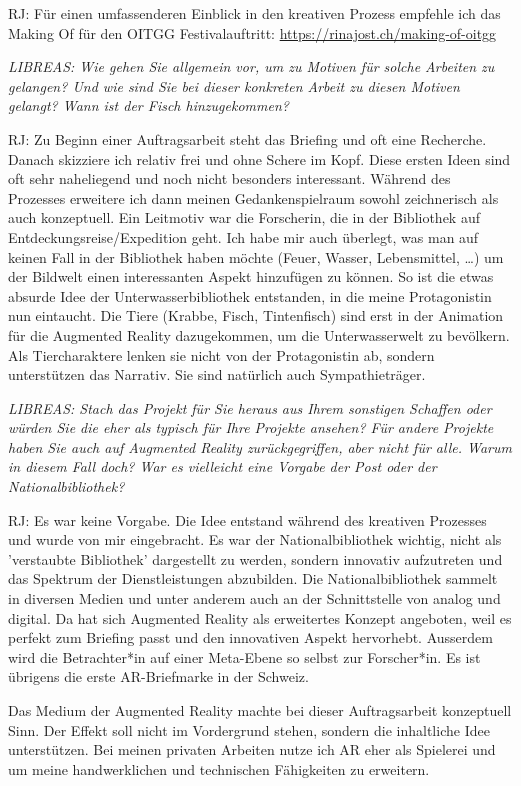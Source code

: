\documentclass[a4paper,
fontsize=11pt,
oneside,
numbers=noperiodatend,
parskip=half-,
bibliography=totoc,
final
]{scrartcl}
\begin{document}
RJ: Für einen umfassenderen Einblick in den kreativen Prozess empfehle
ich das Making Of für den OITGG Festivalauftritt:
\url{https://rinajost.ch/making-of-oitgg}

\emph{LIBREAS: Wie gehen Sie allgemein vor, um zu Motiven für solche
Arbeiten zu gelangen? Und wie sind Sie bei dieser konkreten Arbeit zu
diesen Motiven gelangt? Wann ist der Fisch hinzugekommen?}

RJ: Zu Beginn einer Auftragsarbeit steht das Briefing und oft eine
Recherche. Danach skizziere ich relativ frei und ohne Schere im Kopf.
Diese ersten Ideen sind oft sehr naheliegend und noch nicht besonders
interessant. Während des Prozesses erweitere ich dann meinen
Gedankenspielraum sowohl zeichnerisch als auch konzeptuell. Ein
Leitmotiv war die Forscherin, die in der Bibliothek auf
Entdeckungsreise/Expedition geht. Ich habe mir auch überlegt, was man
auf keinen Fall in der Bibliothek haben möchte (Feuer, Wasser,
Lebensmittel, \ldots) um der Bildwelt einen interessanten Aspekt
hinzufügen zu können. So ist die etwas absurde Idee der
Unterwasserbibliothek entstanden, in die meine Protagonistin nun
eintaucht. Die Tiere (Krabbe, Fisch, Tintenfisch) sind erst in der
Animation für die Augmented Reality dazugekommen, um die Unterwasserwelt
zu bevölkern. Als Tiercharaktere lenken sie nicht von der Protagonistin
ab, sondern unterstützen das Narrativ. Sie sind natürlich auch
Sympathieträger.

\emph{LIBREAS: Stach das Projekt für Sie heraus aus Ihrem sonstigen
Schaffen oder würden Sie die eher als typisch für Ihre Projekte ansehen?
Für andere Projekte haben Sie auch auf Augmented Reality
zurückgegriffen, aber nicht für alle. Warum in diesem Fall doch? War es
vielleicht eine Vorgabe der Post oder der Nationalbibliothek?}

RJ: Es war keine Vorgabe. Die Idee entstand während des kreativen
Prozesses und wurde von mir eingebracht. Es war der Nationalbibliothek
wichtig, nicht als 'verstaubte Bibliothek' dargestellt zu werden,
sondern innovativ aufzutreten und das Spektrum der Dienstleistungen
abzubilden. Die Nationalbibliothek sammelt in diversen Medien und unter
anderem auch an der Schnittstelle von analog und digital. Da hat sich
Augmented Reality als erweitertes Konzept angeboten, weil es perfekt zum
Briefing passt und den innovativen Aspekt hervorhebt. Ausserdem wird die
Betrachter*in auf einer Meta-Ebene so selbst zur Forscher*in. Es ist
übrigens die erste AR-Briefmarke in der Schweiz.

Das Medium der Augmented Reality machte bei dieser Auftragsarbeit
konzeptuell Sinn. Der Effekt soll nicht im Vordergrund stehen, sondern
die inhaltliche Idee unterstützen. Bei meinen privaten Arbeiten nutze
ich AR eher als Spielerei und um meine handwerklichen und technischen
Fähigkeiten zu erweitern.
\end{document}
